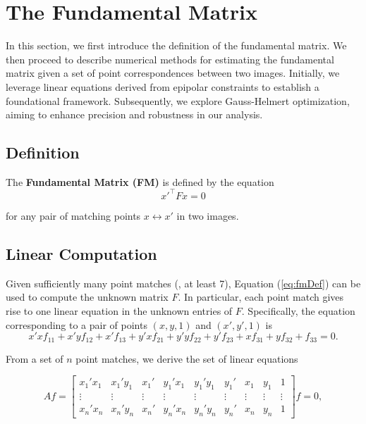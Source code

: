 \section{The Fundamental Matrix}\label{sec:fm}
In this section, we first introduce the definition of the fundamental matrix. We then proceed to describe numerical methods for estimating the fundamental matrix given a set of point correspondences between two images. Initially, we leverage linear equations derived from epipolar constraints to establish a foundational framework. Subsequently, we explore Gauss-Helmert optimization, aiming to enhance precision and robustness in our analysis.

\subsection{Definition}
The \textbf{Fundamental Matrix (FM)} is defined by the equation
\begin{equation}
	x'^\top Fx = 0
	\label{eq:fmDef}
\end{equation}

for any pair of matching points \( x \leftrightarrow x' \) in two images. 

\subsection{Linear Computation}
Given sufficiently many point matches (\ie, at least 7), Equation (\ref{eq:fmDef}) can be used to compute the unknown matrix \( F \). In particular, each point match gives rise to one linear equation in the unknown entries of \( F \). Specifically, the equation corresponding to a pair of points \( (x, y, 1) \) and \( (x', y', 1) \) is
\begin{equation}
	x'xf_{11} + x'yf_{12} + x'f_{13} + y'xf_{21} + y'yf_{22} + y'f_{23} + xf_{31} + yf_{32} + f_{33} = 0.
\end{equation}

From a set of \( n \) point matches, we derive the set of linear equations

\begin{equation}
	Af = 
	\begin{bmatrix}
	x_1'x_1 & x_1'y_1 & x_1' & y_1'x_1 & y_1'y_1 & y_1' & x_1 & y_1 & 1\\
	\vdots & \vdots & \vdots & \vdots & \vdots & \vdots & \vdots & \vdots & \vdots\\
	x_n'x_n & x_n'y_n & x_n' & y_n'x_n & y_n'y_n & y_n' & x_n & y_n & 1
	\end{bmatrix}
	f = 0,
	\label{eq:LinearFM}
\end{equation}


